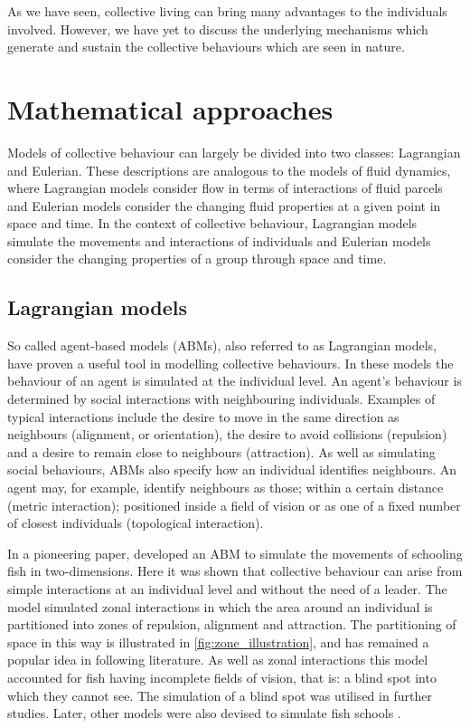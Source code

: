 As we have seen, collective living can bring many advantages to the individuals involved. However, we have yet to discuss the underlying mechanisms which generate and sustain the collective behaviours which are seen in nature.

\section{Mathematical approaches}
\label{sec:models}

Models of collective behaviour can largely be divided into two classes: Lagrangian and Eulerian. These descriptions are analogous to the models of fluid dynamics, where Lagrangian models consider flow in terms of interactions of fluid parcels and Eulerian models consider the changing fluid properties at a given point in space and time. In the context of collective behaviour, Lagrangian models simulate the movements and interactions of individuals and Eulerian models consider the changing properties of a group through space and time.

\subsection{Lagrangian models}
\label{ssec:lagrangian_models}

So called agent-based models (ABMs), also referred to as Lagrangian models, have proven a useful tool in modelling collective behaviours. In these models the behaviour of an agent is simulated at the individual level. An agent's behaviour is determined by social interactions with neighbouring individuals. Examples of typical interactions include the desire to move in the same direction as neighbours (alignment, or orientation), the desire to avoid collisions (repulsion) and a desire to remain close to neighbours (attraction). As well as simulating social behaviours, ABMs also specify how an individual identifies neighbours. An agent may, for example, identify neighbours as those; within a certain distance (metric interaction); positioned inside a field of vision or as one of a fixed number of closest individuals (topological interaction).

In a pioneering paper, \textcite{aoki82} developed an ABM to simulate the movements of schooling fish in two-dimensions. Here it was shown that collective behaviour can arise from simple interactions at an individual level and without the need of a leader. The model simulated zonal interactions in which the area around an individual is partitioned into zones of repulsion, alignment and attraction. The partitioning of space in this way is illustrated in \cref{fig:zone_illustration}, and has remained a popular idea in following literature. As well as zonal interactions this model accounted for fish having incomplete fields of vision, that is: a blind spot into which they cannot see. The simulation of a blind spot was utilised in further studies. Later, other models were also devised to simulate fish schools \parencite{okubo86, huth92}.

